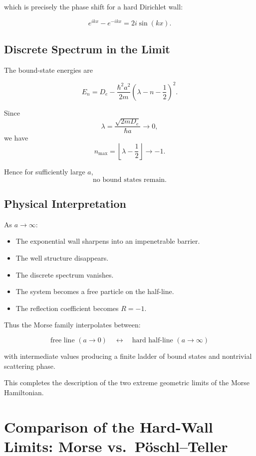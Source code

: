 \documentclass[11pt]{article}
\begin{document}
which is precisely the phase shift for
a hard Dirichlet wall:

\[
e^{ikx} - e^{-ikx}
=
2i \sin(kx).
\]

\subsection{Discrete Spectrum in the Limit}

The bound-state energies are

\[
E_n
=
D_e
-
\frac{\hbar^2 a^2}{2m}
\left(\lambda-n-\frac12\right)^2.
\]

Since
\[
\lambda=\frac{\sqrt{2mD_e}}{\hbar a}\to 0,
\]
we have
\[
n_{\max}=\left\lfloor\lambda-\frac12\right\rfloor\to -1.
\]

Hence for sufficiently large $a$,
\[
\text{no bound states remain.}
\]

\subsection{Physical Interpretation}

As $a\to\infty$:

\begin{itemize}
\item The exponential wall sharpens into an impenetrable barrier.
\item The well structure disappears.
\item The discrete spectrum vanishes.
\item The system becomes a free particle on the half-line.
\item The reflection coefficient becomes $R=-1$.
\end{itemize}

Thus the Morse family interpolates between:

\[
\boxed{
\text{free line } (a\to 0)
\quad \longleftrightarrow \quad
\text{hard half-line } (a\to\infty)
}
\]

with intermediate values producing
a finite ladder of bound states and
nontrivial scattering phase.

\bigskip

This completes the description of the two extreme geometric limits
of the Morse Hamiltonian.

\section{Comparison of the Hard-Wall Limits:
Morse vs.\ P\"oschl--Teller}
\end{document}
